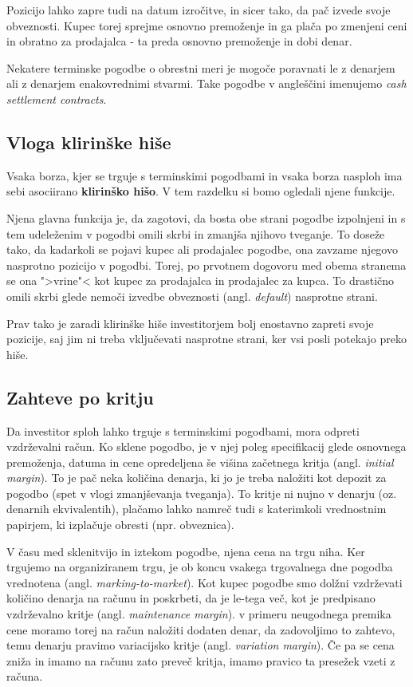 \documentclass[a4paper, 11pt]{article}
\begin{document}
Pozicijo lahko zapre tudi na datum izročitve, in sicer tako, da pač izvede svoje obveznosti. 
Kupec torej sprejme osnovno premoženje in ga plača po zmenjeni ceni in obratno za prodajalca - 
ta preda osnovno premoženje in dobi denar. 

Nekatere terminske pogodbe o obrestni meri je mogoče poravnati le z denarjem ali z denarjem 
enakovrednimi stvarmi. Take pogodbe v angleščini imenujemo \textit{cash settlement contracts}.

\subsection{Vloga klirinške hiše}
Vsaka borza, kjer se trguje s terminskimi pogodbami in vsaka borza nasploh ima sebi asociirano 
\textbf{klirinško hišo}. V tem razdelku si bomo ogledali njene funkcije.

Njena glavna funkcija je, da zagotovi, da bosta obe strani pogodbe izpolnjeni in s tem 
udeleženim v pogodbi omili skrbi in zmanjša njihovo tveganje. To doseže tako, da kadarkoli
se pojavi kupec ali prodajalec pogodbe, ona zavzame njegovo nasprotno pozicijo v pogodbi.
Torej, po prvotnem dogovoru med obema stranema se ona ">vrine"< kot kupec za prodajalca in 
prodajalec za kupca. To drastično omili skrbi glede nemoči izvedbe obveznosti (angl. 
\textit{default}) nasprotne strani. 

Prav tako je zaradi klirinške hiše investitorjem bolj enostavno zapreti svoje pozicije, saj 
jim ni treba vključevati nasprotne strani, ker vsi posli potekajo preko hiše. 

\subsection{Zahteve po kritju}
Da investitor sploh lahko trguje s terminskimi pogodbami, mora odpreti vzdrževalni račun. 
Ko sklene pogodbo, je v njej poleg specifikacij glede osnovnega premoženja, datuma in cene 
opredeljena še višina začetnega kritja (angl. \textit{initial margin}). To je pač neka 
količina denarja, ki jo je treba naložiti kot depozit za pogodbo (spet v vlogi zmanjševanja 
tveganja). To kritje ni nujno v denarju (oz. denarnih ekvivalentih), plačamo lahko namreč 
tudi s katerimkoli vrednostnim papirjem, ki izplačuje obresti (npr. obveznica).

V času med sklenitvijo in iztekom pogodbe, njena cena na trgu niha. Ker trgujemo na organiziranem
trgu, je ob koncu vsakega trgovalnega dne pogodba vrednotena (angl. \textit{marking-to-market}). 
Kot kupec pogodbe smo dolžni vzdrževati količino denarja na računu in poskrbeti, da je le-tega več, 
kot je predpisano vzdrževalno kritje (angl. \textit{maintenance margin}). v primeru neugodnega 
premika cene moramo torej na račun naložiti dodaten denar, da zadovoljimo to zahtevo, temu denarju 
pravimo variacijsko kritje (angl. \textit{variation margin}). Če pa se cena zniža in imamo na 
računu zato preveč kritja, imamo pravico ta presežek vzeti z računa. 
\end{document}
